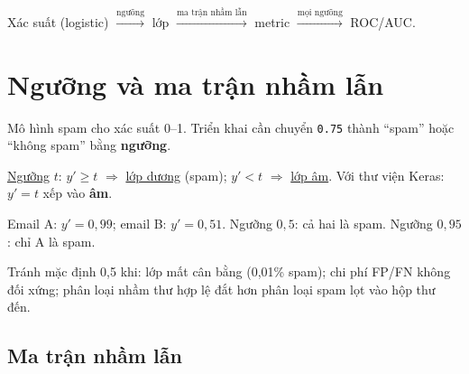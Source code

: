 \documentclass[12pt,a4paper]{article}
\begin{document}
\begin{phuongphap}[title={Luồng module}]
Xác suất (logistic) $\xrightarrow{\text{ngưỡng}}$ lớp $\xrightarrow{\text{ma trận nhầm lẫn}}$ metric $\xrightarrow{\text{mọi ngưỡng}}$ ROC/AUC.
\end{phuongphap}

\newpage

\section{Ngưỡng và ma trận nhầm lẫn}

\begin{dongco}[title={Từ 0,75 sang thư mục spam}]
Mô hình spam cho xác suất 0--1. Triển khai cần chuyển \texttt{0.75} thành ``spam'' hoặc ``không spam'' bằng \textbf{ngưỡng}.
\end{dongco}

\begin{dinhnghia}[title={Ngưỡng phân loại}]
\href{https://developers.google.com/machine-learning/glossary\#classification-threshold}{Ngưỡng} $t$: $y' \geq t$ $\Rightarrow$ \href{https://developers.google.com/machine-learning/glossary\#positive_class}{lớp dương} (spam); $y' < t$ $\Rightarrow$ \href{https://developers.google.com/machine-learning/glossary\#negative_class}{lớp âm}. Với thư viện Keras: $y'=t$ xếp vào \textbf{âm}.
\end{dinhnghia}

\begin{vidu}[title={0,51 vs 0,99 với ngưỡng khác nhau}]
Email A: $y'=0{,}99$; email B: $y'=0{,}51$. Ngưỡng $0{,}5$: cả hai là spam. Ngưỡng $0{,}95$: chỉ A là spam.
\end{vidu}

\begin{luuy}[title={0,5 không luôn tối ưu}]
Tránh mặc định 0,5 khi: lớp mất cân bằng (0,01\% spam); chi phí FP/FN không đối xứng; phân loại nhầm thư hợp lệ đắt hơn phân loại spam lọt vào hộp thư đến.
\end{luuy}

\subsection{Ma trận nhầm lẫn}
\end{document}

